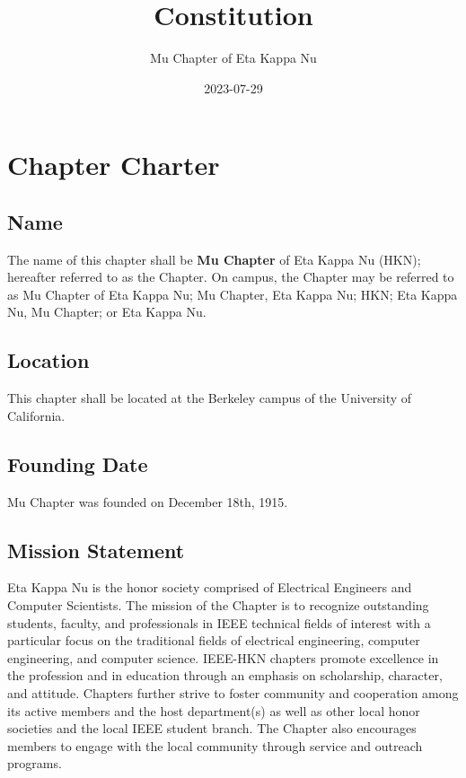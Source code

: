 \documentclass[11pt]{article}
\author{Mu Chapter of Eta Kappa Nu}
\date{2023-07-29}
\title{Constitution}
\begin{document}
\maketitle
\tableofcontents


\section{Chapter Charter}
\label{sec:orgc11a0d1}

\subsection{Name}
\label{sec:org26e0e74}

The name of this chapter shall be \textbf{\textbf{Mu Chapter}} of Eta Kappa Nu (HKN); hereafter referred to as the Chapter.
On campus, the Chapter may be referred to as Mu Chapter of Eta Kappa Nu; Mu Chapter, Eta Kappa Nu; HKN; Eta Kappa Nu, Mu Chapter; or Eta Kappa Nu.

\subsection{Location}
\label{sec:org5a5ce86}

This chapter shall be located at the Berkeley campus of the University of California.

\subsection{Founding Date}
\label{sec:orgff75e4e}

Mu Chapter was founded on December 18th, 1915.

\subsection{Mission Statement}
\label{sec:org848ac28}

Eta Kappa Nu is the honor society comprised of Electrical Engineers and Computer Scientists.
The mission of the Chapter is to recognize outstanding students, faculty, and professionals in IEEE technical fields of interest with a particular focus on the traditional fields of electrical engineering, computer engineering, and computer science.
IEEE-HKN chapters promote excellence in the profession and in education through an emphasis on scholarship, character, and attitude.
Chapters further strive to foster community and cooperation among its active members and the host department(s) as well as other local honor societies and the local IEEE student branch.
The Chapter also encourages members to engage with the local community through service and outreach programs.
\end{document}
